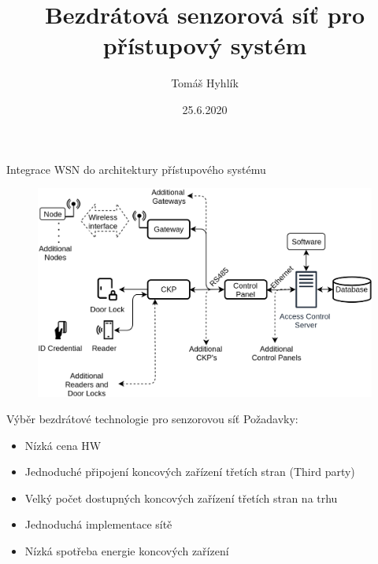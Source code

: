 \documentclass{beamer}
\title{Bezdrátová senzorová síť pro přístupový systém}
\date{25.6.2020}
\author{Tomáš Hyhlík}
\institute{Diplomová práce}
\begin{document}
  \maketitle

  

\begin{frame}{Integrace WSN do architektury přístupového systému}

	\begin{figure}[h]
		\centering
		\includegraphics[width=1\textwidth]{ACS_IoT_extension_21}
		\label{fig:ACS architecture IMA with geteway}
	\end{figure}
		
\end{frame}



\begin{frame}{Výběr bezdrátové technologie pro senzorovou síť}
	Požadavky:
	\begin{itemize}
		\item Nízká cena HW
		\item Jednoduché připojení koncových zařízení třetích stran (Third party)
		\item Velký počet dostupných koncových zařízení třetích stran na trhu 
		\item Jednoduchá implementace sítě
		\item Nízká spotřeba energie koncových zařízení
	\end{itemize}

\end{frame}
\end{document}
